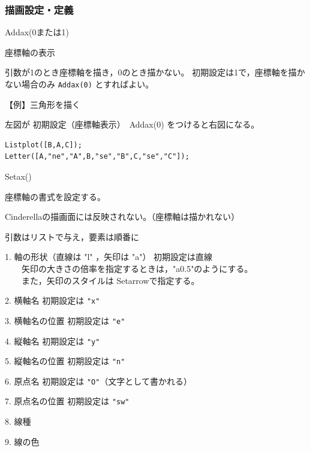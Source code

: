 \documentclass[papersize,a4paper,10pt,uplatex]{jsarticle}
\begin{document}
\subsubsection{描画設定・定義}

\vspace{\baselineskip}
\begin{description}
\hypertarget{addax}{}
\item[関数]Addax(0または1)
\item[機能]座標軸の表示
\item[説明]引数が1のとき座標軸を描き，0のとき描かない。
初期設定は1で，座標軸を描かない場合のみ \verb|Addax(0)| とすればよい。

\vspace{\baselineskip}
【例】三角形を描く

左図が 初期設定（座標軸表示）　Addax(0) をつけると右図になる。

\begin{verbatim}
Listplot([B,A,C]);
Letter([A,"ne","A",B,"se","B",C,"se","C"]);
\end{verbatim}

\vspace{\baselineskip}
\hspace{10mm} 


\hypertarget{setax}{}
\item[関数]Setax()
\item[機能]座標軸の書式を設定する。
\item[説明]Cinderellaの描画面には反映されない。（座標軸は描かれない）

引数はリストで与え，要素は順番に

1. 軸の形状（直線は "l" ，矢印は "a"） 初期設定は直線\\
　　矢印の大きさの倍率を指定するときは，"a0.5"のようにする。\\
　　また，矢印のスタイルは Setarrowで指定する。

2. 横軸名 初期設定は \verb|"x"|

3. 横軸名の位置 初期設定は \verb|"e"|

4. 縦軸名 初期設定は \verb|"y"|

5. 縦軸名の位置 初期設定は \verb|"n"|

6. 原点名 初期設定は \verb|"O"|（文字として書かれる）

7. 原点名の位置 初期設定は \verb|"sw"|

8. 線種

9. 線の色


\end{description}
\end{document}
